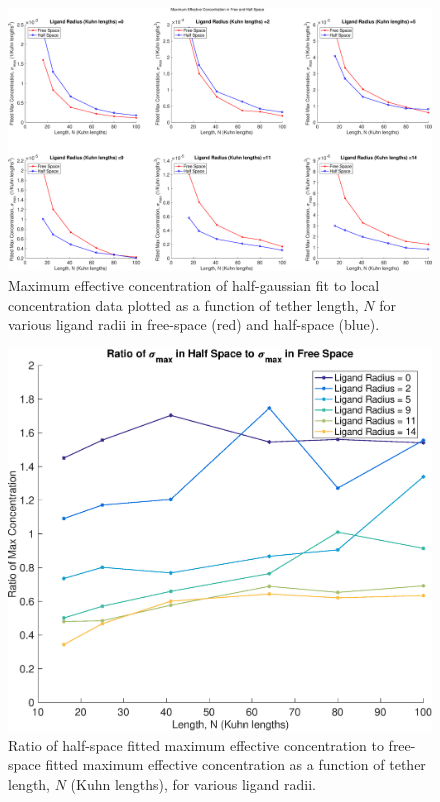 \documentclass[../../AdvancementSummary.tex]{subfiles}
\begin{document}
\begin{figure}[H]
    \begin{center}
        		\includegraphics[width=\linewidth]{ResultsFigures/MaxEffConc/MaximumEffConcFreeHalf.eps}
        \caption{Maximum effective concentration of half-gaussian fit to local concentration data plotted as a function of tether length, $N$ for various ligand radii in free-space (red) and half-space (blue). \label{fig: MaxEffConc}}
    \end{center}
\end{figure}

\begin{figure}[H]
    \begin{center}
        		\includegraphics[width=0.7\linewidth]{ResultsFigures/MaxEffConc/MaximumEffConcRatio.eps}
        \caption{Ratio of half-space fitted maximum effective concentration to free-space fitted maximum effective concentration as a function of tether length, $N$ (Kuhn lengths), for various ligand radii. \label{fig: MaxEffConcRatio}}
    \end{center}
\end{figure}
\end{document}
